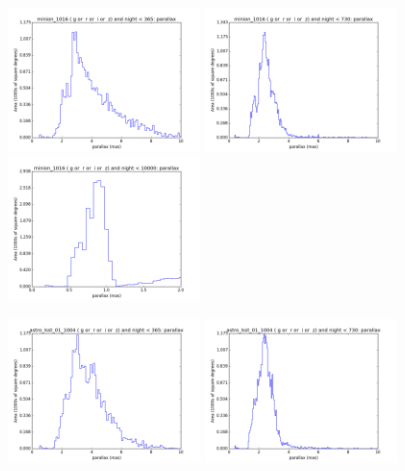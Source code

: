 \begin{figure}[ht]
  \begin{center}
  \includegraphics[width=2.0in]{./figs/milkyway/astromPanels/MW_Astrom_paError_Baseline_01y_hst.png}
  \includegraphics[width=2.0in]{./figs/milkyway/astromPanels/MW_Astrom_paError_Baseline_02y_hst.png}
  \includegraphics[width=2.0in]{./figs/milkyway/astromPanels/MW_Astrom_paError_Baseline_10y_hst.png}
  \end{center}
  \begin{center}
  \includegraphics[width=2.0in]{./figs/milkyway/astromPanels/MW_Astrom_paError_wfdPlane_01y_hst.png}
  \includegraphics[width=2.0in]{./figs/milkyway/astromPanels/MW_Astrom_paError_wfdPlane_02y_hst.png}

\end{center}
\end{figure}
